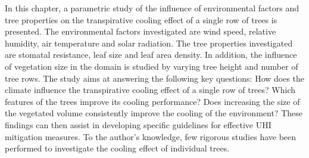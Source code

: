 
In this chapter, a parametric study of the influence of environmental factors and tree properties on the transpirative cooling effect of a single row of trees is presented. The environmental factors investigated are wind speed, relative humidity, air temperature and solar radiation. The tree properties investigated are stomatal resistance, leaf size and leaf area density. In addition, the influence of vegetation size in the domain is studied by varying tree height and number of tree rows. The study aims at answering the following key questions: How does the climate influence the transpirative cooling effect of a single row of trees? Which features of the trees improve its cooling performance? Does increasing the size of the vegetated volume consistently improve the cooling of the environment? These findings can then assist in developing specific guidelines for effective UHI mitigation measures. To the author’s knowledge, few rigorous studies have been performed to investigate the cooling effect of individual trees. 


